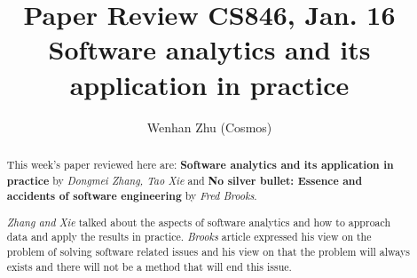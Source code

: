 \documentclass[sigconf]{acmart}
\begin{document}
%
\title{Paper Review CS846, Jan. 16\\
Software analytics and its application in practice}

%
\author{Wenhan Zhu (Cosmos)}

%
\begin{abstract}
    This week's paper reviewed here are: {\bf Software analytics and its application in practice} by {\it Dongmei Zhang, Tao Xie} and {\bf No silver bullet: Essence and accidents of software engineering} by {\it Fred Brooks}. 
    
    {\it Zhang and Xie} talked about the aspects of software analytics and how to approach data and apply the results in practice. {\it Brooks} article expressed his view on the problem of solving software related issues and his view on that the problem will always exists and there will not be a method that will end this issue.
\end{abstract}

%

%

%
\maketitle
\end{document}
